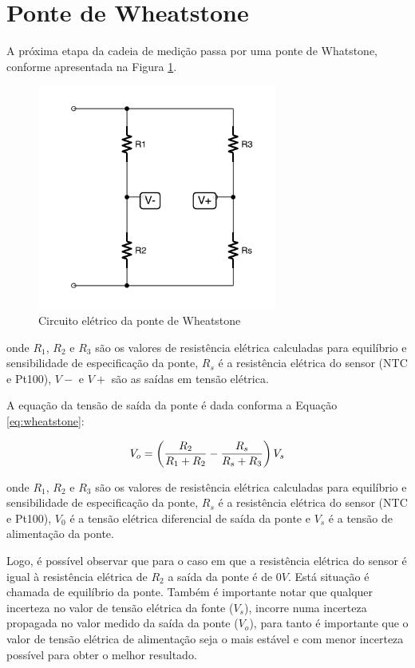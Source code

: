 \documentclass[a4paper]{instrumentacao}
\begin{document}
\section{Ponte de Wheatstone}

A próxima etapa da cadeia de medição passa por uma ponte de Whatstone, conforme apresentada na Figura \ref{fig:wheatstone}.

\begin{figure}[H]
\center
\includegraphics[width=0.7\textwidth]{Wheatstone.pdf}
\caption{Circuito elétrico da ponte de Wheatstone}
\label{fig:wheatstone}
\end{figure}

\noindent onde $R_1$, $R_2$ e $R_3$ são os valores de resistência elétrica calculadas para equilíbrio e sensibilidade de especificação da ponte, $R_s$ é a resistência elétrica do sensor (NTC e Pt100), $V-$ e $V+$ são as saídas em tensão elétrica.

A equação da tensão de saída da ponte é dada conforma a Equação \ref{eq:wheatstone}:

\begin{equation}
	V_o = \left({{R_2}\over{R_1 + R_2}} - {{R_s}\over{R_s + R_3}}\right)V_s
	\label{eq:wheatstone}
\end{equation}

\noindent onde $R_1$, $R_2$ e $R_3$ são os valores de resistência elétrica calculadas para equilíbrio e sensibilidade de especificação da ponte, $R_s$ é a resistência elétrica do sensor (NTC e Pt100), $V_0$ é a tensão elétrica diferencial de saída da ponte e $V_s$ é a tensão de alimentação da ponte.

Logo, é possível observar que para o caso em que a resistência elétrica do sensor é igual à resistência elétrica de $R_2$ a saída da ponte é de $0V$. Está situação é chamada de equilíbrio da ponte. Também é importante notar que qualquer incerteza no valor de tensão elétrica da fonte ($V_s$), incorre numa incerteza propagada no valor medido da saída da ponte ($V_o$), para tanto é importante que o valor de tensão elétrica de alimentação seja o mais estável e com menor incerteza possível para obter o melhor resultado.
\end{document}
